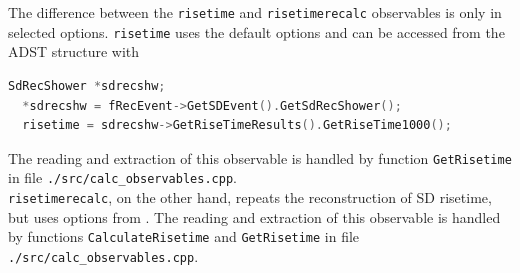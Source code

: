 \documentclass[12pt,a4paper]{report}
\begin{document}
The difference between the \texttt{risetime} and \texttt{risetimerecalc} observables is only in selected options. \texttt{risetime} uses the default options and can be accessed from the ADST structure with
\begin{lstlisting}[language=C++]
  SdRecShower *sdrecshw;
  *sdrecshw = fRecEvent->GetSDEvent().GetSdRecShower();
  risetime = sdrecshw->GetRiseTimeResults().GetRiseTime1000();
\end{lstlisting}
The reading and extraction of this observable is handled by function \texttt{GetRisetime} in file \texttt{./src/calc\_observables.cpp}.\\
\texttt{risetimerecalc}, on the other hand, repeats the reconstruction of SD risetime, but uses options from \cite{deltaMethod}. The reading and extraction of this observable is handled by functions \texttt{CalculateRisetime} and \texttt{GetRisetime} in file \texttt{./src/calc\_observables.cpp}.
\end{document}
